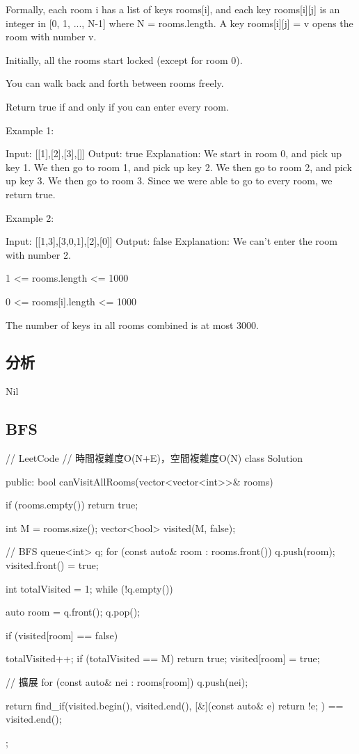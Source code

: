 Formally, each room i has a list of keys rooms[i], and each key rooms[i][j] is an integer in [0, 1, ..., N-1] where N = rooms.length.  A key rooms[i][j] = v opens the room with number v.

Initially, all the rooms start locked (except for room 0). 

You can walk back and forth between rooms freely.

Return true if and only if you can enter every room.

Example 1:
\begin{Code}
Input: [[1],[2],[3],[]]
Output: true
Explanation:  
We start in room 0, and pick up key 1.
We then go to room 1, and pick up key 2.
We then go to room 2, and pick up key 3.
We then go to room 3.  Since we were able to go to every room, we return true.
\end{Code}

Example 2:
\begin{Code}
Input: [[1,3],[3,0,1],[2],[0]]
Output: false
Explanation: We can't enter the room with number 2.
\end{Code}

\begindot
\item 1 <= rooms.length <= 1000
\item 0 <= rooms[i].length <= 1000
\item The number of keys in all rooms combined is at most 3000.
\myenddot

\subsection{分析}
Nil

\subsection{BFS}
\begin{Code}
// LeetCode
// 時間複雜度O(N+E)，空間複雜度O(N)
class Solution {
public:
    bool canVisitAllRooms(vector<vector<int>>& rooms) {
        if (rooms.empty()) return true;

        int M = rooms.size();
        vector<bool> visited(M, false);

        // BFS
        queue<int> q;
        for (const auto& room : rooms.front())
            q.push(room);
        visited.front() = true;

        int totalVisited = 1;
        while (!q.empty())
        {
            auto room = q.front();
            q.pop();

            if (visited[room] == false)
            {
                totalVisited++;
                if (totalVisited == M) return true;
                visited[room] = true;

                // 擴展
                for (const auto& nei : rooms[room])
                    q.push(nei);
            }
        }

        return find_if(visited.begin(), visited.end(), [&](const auto& e){ return !e; })
                       == visited.end();
    }
};
\end{Code}

